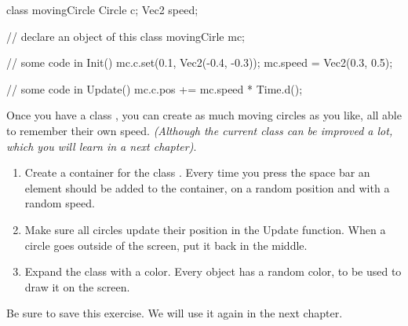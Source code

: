\begin{code}
class movingCircle {
  Circle c;
  Vec2 speed;
}

// declare an object of this class
movingCirle mc;

// some code in Init()
mc.c.set(0.1, Vec2(-0.4, -0.3));
mc.speed = Vec2(0.3, 0.5);

// some code in Update()
mc.c.pos += mc.speed * Time.d();
\end{code}

Once you have a class , you can create as much moving circles as you like, all able to remember their own speed. \textit{(Although the current class can be improved a lot, which you will learn in a next chapter)}.

\begin{exercise}
\begin{enumerate}
  \item Create a container for the class . Every time you press the space bar an element should be added to the container, on a random position and with a random speed.
	\item Make sure all circles update their position in the Update function. When a circle goes outside of the screen, put it back in the middle.
	\item Expand the class  with a color. Every object has a random color, to be used to draw it on the screen.
	\end{enumerate}
\end{exercise}

\begin{note}
Be sure to save this exercise. We will use it again in the next chapter.
\end{note}
